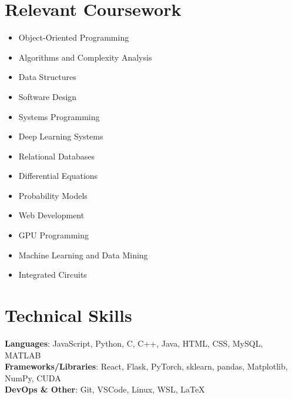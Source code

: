 \documentclass[letterpaper,11pt]{article}
\newcommand{\resumeSubHeadingListStart}{\begin{itemize}[leftmargin=0.0in, label={}]}
\newcommand{\resumeSubHeadingListEnd}{\end{itemize}}
\begin{document}
\section{Relevant Coursework}
        \begin{multicols}{4}
            \begin{itemize}[itemsep=-4pt, parsep=5pt]
                \item\small Object-Oriented Programming
                \item Algorithms and Complexity Analysis
                \item Data Structures
                \item Software Design
                \item Systems Programming
                \item Deep Learning Systems
                \item Relational Databases
                \item Differential Equations
                \item Probability Models
                \item Web Development
                \item GPU Programming
                \item Machine Learning and Data Mining
                \item Integrated Circuits
            \end{itemize}
        \end{multicols}
        \vspace*{2.0\multicolsep}

\vspace{-4pt}

%
\section{Technical Skills}
 \begin{itemize}[leftmargin=0.15in, label={}]
    \small{\item{
     \textbf{Languages}{: JavaScript, Python, C, C++, Java, HTML, CSS, MySQL, MATLAB} \\
     \textbf{Frameworks/Libraries}{: React, Flask, PyTorch, sklearn, pandas, Matplotlib, NumPy, CUDA} \\
     \textbf{DevOps \& Other}{: Git, VSCode, Linux, WSL, LaTeX}
    }}
 \end{itemize}
 \vspace{-18pt}
\end{document}

